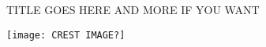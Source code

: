 \begin{titlepage}

\begin{center}
\linespread{1.3}
\textsc{\LARGE TITLE GOES HERE}
\textsc{\LARGE AND MORE IF YOU WANT} 
\vfill
{}

\vfill 

\texttt{[image: CREST IMAGE?]}

\vfill 

\end{center}
\end{titlepage}

